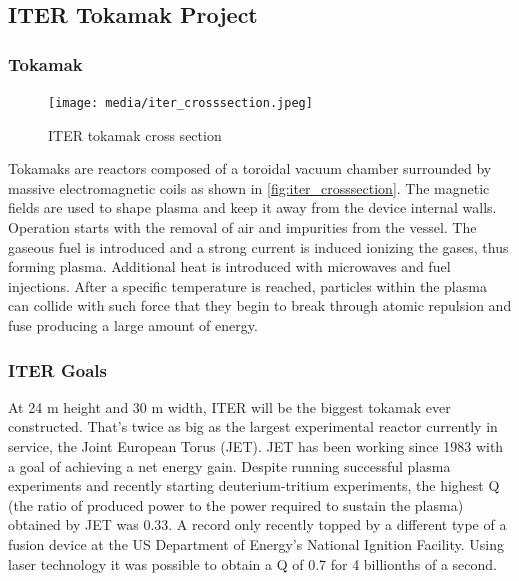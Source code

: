 \subsection{ITER Tokamak Project}
  \subsubsection{Tokamak}
	\begin{figure}[H]
	  \centering
	  \texttt{[image: media/iter\_crosssection.jpeg]}
	  \caption{ITER tokamak cross section \cite{iter_website}}
	  \label{fig:iter_crosssection}
	\end{figure}
	Tokamaks are reactors composed of a toroidal vacuum chamber surrounded by
	massive electromagnetic coils as shown in \autoref{fig:iter_crosssection}.
	The magnetic fields are used to shape plasma 
	and keep it away from the device internal walls. 
	Operation starts with the removal of air and impurities from the vessel.
	The gaseous fuel is introduced and a strong current is induced 
	ionizing the gases, thus forming plasma. Additional heat is introduced with
	microwaves and fuel injections. After a specific temperature is reached, 
	particles within the plasma can collide with such force that they begin
	to break through atomic repulsion and fuse producing a large amount of energy.
	\cite{iter_website}
  \subsubsection{ITER Goals}

	At 24 m height and 30 m width, 
	ITER will be the biggest tokamak ever constructed. 
	That's twice as big as the largest experimental reactor currently in service, 
	the Joint European Torus (JET). JET has been working since 1983 with 
	a goal of achieving a net energy gain. Despite running successful 
	plasma experiments and recently starting deuterium-tritium experiments,
	the highest Q 
	(the ratio of produced power to the power required to sustain the plasma)
	obtained by JET was 0.33. A record only recently topped by a different 
	type of a fusion device at the US Department of Energy’s
	National Ignition Facility. Using laser technology it was possible to
	obtain a Q of 0.7 for 4 billionths of a second. \cite{fusion_records}
	

